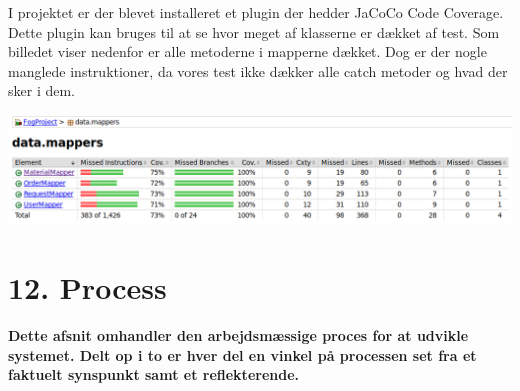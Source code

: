 \documentclass[11pt]{report}
\begin{document}
I projektet er der blevet installeret et plugin der hedder JaCoCo Code
Coverage. Dette plugin kan bruges til at se hvor meget af klasserne er
dækket af test. Som billedet viser nedenfor er alle metoderne i
mapperne dækket. Dog er der nogle manglede instruktioner, da vores
test ikke dækker alle catch metoder og hvad der sker i dem.
\begin{center}
\includegraphics[width=15cm]{Test-Coverage.png}
\end{center}

\chapter*{12. Process}
\textbf{Dette afsnit omhandler den arbejdsmæssige proces for at udvikle systemet. Delt op i to er hver del en vinkel på processen set fra et faktuelt synspunkt samt et reflekterende.}
\end{document}
